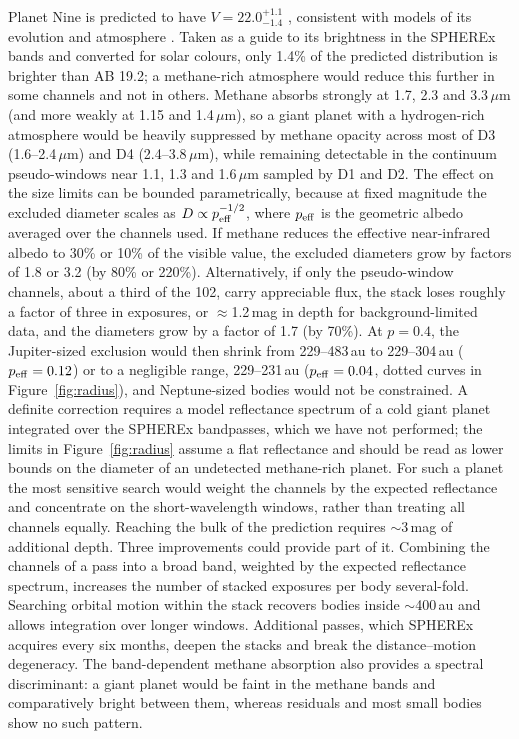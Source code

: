 \documentclass[twocolumn,linenumbers,anonymous]{aastex702}
\begin{document}
Planet Nine is predicted to have $V = 22.0^{+1.1}_{-1.4}$ \citep{brown24}, consistent with models of its evolution and atmosphere \citep{fortney16,linder16}. Taken as a guide to its brightness in the SPHEREx bands and converted for solar colours, only 1.4\% of the predicted distribution is brighter than AB 19.2; a methane-rich atmosphere would reduce this further in some channels and not in others. Methane absorbs strongly at 1.7, 2.3 and 3.3\,$\mu$m (and more weakly at 1.15 and 1.4\,$\mu$m), so a giant planet with a hydrogen-rich atmosphere would be heavily suppressed by methane opacity across most of D3 (1.6--2.4\,$\mu$m) and D4 (2.4--3.8\,$\mu$m), while remaining detectable in the continuum pseudo-windows near 1.1, 1.3 and 1.6\,$\mu$m sampled by D1 and D2. The effect on the size limits can be bounded parametrically, because at fixed magnitude the excluded diameter scales as $D \propto p_{\rm eff}^{-1/2}$, where $p_{\rm eff}$ is the geometric albedo averaged over the channels used. If methane reduces the effective near-infrared albedo to 30\% or 10\% of the visible value, the excluded diameters grow by factors of 1.8 or 3.2 (by 80\% or 220\%). Alternatively, if only the pseudo-window channels, about a third of the 102, carry appreciable flux, the stack loses roughly a factor of three in exposures, or $\approx$1.2\,mag in depth for background-limited data, and the diameters grow by a factor of 1.7 (by 70\%). At $p = 0.4$, the Jupiter-sized exclusion would then shrink from 229--483\,au to 229--304\,au ($p_{\rm eff} = 0.12$) or to a negligible range, 229--231\,au ($p_{\rm eff} = 0.04$, dotted curves in Figure~\ref{fig:radius}), and Neptune-sized bodies would not be constrained. A definite correction requires a model reflectance spectrum of a cold giant planet \citep[e.g.,][]{fortney16,linder16} integrated over the SPHEREx bandpasses, which we have not performed; the limits in Figure~\ref{fig:radius} assume a flat reflectance and should be read as lower bounds on the diameter of an undetected methane-rich planet. For such a planet the most sensitive search would weight the channels by the expected reflectance and concentrate on the short-wavelength windows, rather than treating all channels equally. Reaching the bulk of the prediction requires $\sim$3\,mag of additional depth. Three improvements could provide part of it. Combining the channels of a pass into a broad band, weighted by the expected reflectance spectrum, increases the number of stacked exposures per body several-fold. Searching orbital motion within the stack recovers bodies inside $\sim$400\,au and allows integration over longer windows. Additional passes, which SPHEREx acquires every six months, deepen the stacks and break the distance--motion degeneracy. The band-dependent methane absorption also provides a spectral discriminant: a giant planet would be faint in the methane bands and comparatively bright between them, whereas residuals and most small bodies show no such pattern.
\end{document}
